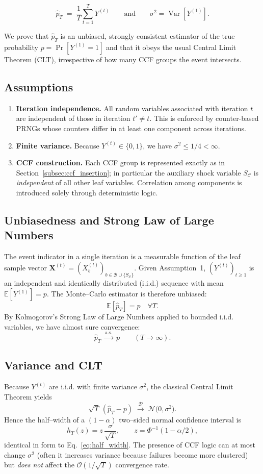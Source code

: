 \[\widehat{p}_T \;=\; \frac{1}{T}\sum_{t=1}^T Y^{(t)}
  \qquad\text{and}\qquad
  \sigma^2 = \operatorname{Var}[Y^{(1)}].\]

We prove that $\widehat{p}_T$ is an unbiased, strongly consistent estimator of
the true probability $p=\Pr[Y^{(1)}=1]$ and that it obeys the usual Central
Limit Theorem (CLT), irrespective of how many CCF groups the event intersects.

\subsection{Assumptions}
\label{subsec:ccf_conv_assumptions}
\begin{enumerate}
  \item \textbf{Iteration independence.}  All random variables associated with
        iteration $t$ are independent of those in iteration $t'\ne t$.  This is
        enforced by counter-based PRNGs whose counters differ in at least one
        component across iterations.
  \item \textbf{Finite variance.}  Because $Y^{(t)}\in\{0,1\}$, we have 
        $\sigma^2\le 1/4<\infty$.
  \item \textbf{CCF construction.}  Each CCF group is represented exactly as in
        Section~\ref{subsec:ccf_insertion}; in particular the auxiliary shock
        variable $S_{\mathcal{C}}$ is \emph{independent} of all other leaf
        variables.  Correlation among components is introduced solely through
        deterministic logic.
\end{enumerate}

\subsection{Unbiasedness and Strong Law of Large Numbers}
The event indicator in a single iteration is a measurable function of the leaf
sample vector
$\mathbf{X}^{(t)}=(X_b^{(t)})_{b\in\mathcal{B}\cup\{S_{\mathcal{C}}\}}$.
Given Assumption~1, $(Y^{(t)})_{t\ge1}$ is an independent and identically
distributed (i.i.d.) sequence with mean $\mathbb{E}[Y^{(1)}]=p$.
The Monte--Carlo estimator is therefore unbiased:
\[\mathbb{E}[\widehat{p}_T]=p\quad\forall T.\]
By Kolmogorov's Strong Law of Large Numbers applied to bounded i.i.d.
variables, we have almost sure convergence:
\[\widehat{p}_T \;\xrightarrow{\text{a.s.}}\; p\qquad (T\to\infty).\]

\subsection{Variance and CLT}
Because $Y^{(t)}$ are i.i.d.
with finite variance $\sigma^2$, the classical Central Limit Theorem yields
\[\sqrt{T}\,(\widehat{p}_T-p)
    \;\xrightarrow{\mathcal{D}}\; \mathcal{N}\bigl(0,\sigma^2\bigr).
\]
Hence the half--width of a $(1-\alpha)$ two–sided normal confidence interval is
\[h_T(z)=z\,\frac{\sigma}{\sqrt{T}},\qquad
  z=\Phi^{-1}(1-\alpha/2),\]
identical in form to Eq.~\eqref{eq:half_width}.  The presence of CCF logic can
at most change $\sigma^2$ (often it increases variance because failures become
more clustered) but \emph{does not} affect the $\mathcal{O}(1/\sqrt{T})$
convergence rate.

